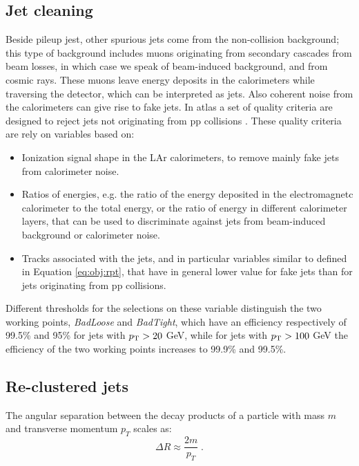 \subsection{Jet cleaning}
\label{sec:jetcleaning}

Beside pileup jest, other spurious jets come from the non-collision background; this type of background includes muons originating from secondary cascades from beam losses, in which case we speak of beam-induced background, and from cosmic rays. These muons leave energy deposits in the calorimeters while traversing the detector, which can be interpreted as jets. Also coherent noise from the calorimeters can give rise to fake jets. In \gls{atlas} a set of quality criteria are designed to reject jets not originating from \gls{pp} collisions \cite{TheATLAScollaboration:2015ofz}. These quality criteria are rely on variables based on:
\begin{itemize}
\item Ionization signal shape in the LAr calorimeters, to remove mainly fake jets from calorimeter noise. 
\item Ratios of energies, e.g. the ratio of the energy deposited in the electromagnetc calorimeter to the total energy, or the ratio of energy in different calorimeter layers, that can be used to discriminate against jets from beam-induced background or calorimeter noise.
\item Tracks associated with the jets, and in particular variables similar to \RpT defined in Equation \ref{eq:obj:rpt}, that have in general lower value for fake jets than for jets originating from \gls{pp} collisions. 
\end{itemize} 

Different thresholds for the selections on these variable distinguish the two working points, \textit{BadLoose} and \textit{BadTight}, which have an efficiency respectively of 99.5\% and 95\% for jets with $p_{\rm T} > 20$ GeV, while for jets with $p_{\rm T} > 100$ GeV the efficiency of the two working points increases to 99.9\% and 99.5\%. 

\subsection{Re-clustered jets}
\label{sec:reclustering}

The angular separation between the decay products of a particle with mass $m$ and transverse momentum 
$p_T$ scales as:
\begin{equation}
\Delta R \approx \frac{2 m}{p_T} \; .
\end{equation}

